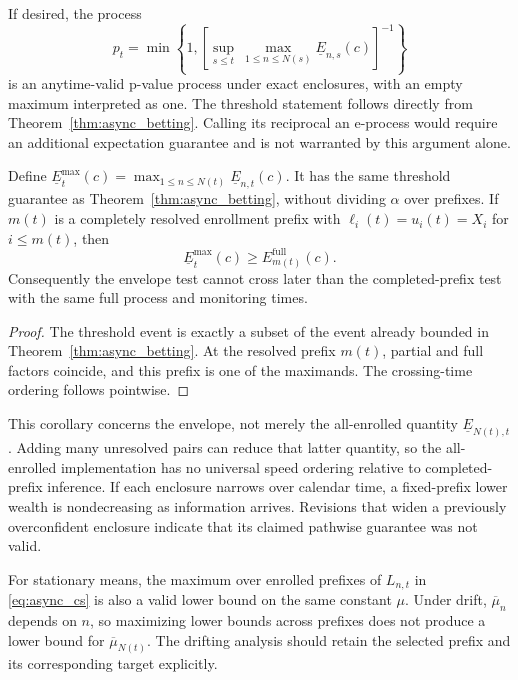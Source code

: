 If desired, the process
\[
 p_t=\min\!\left\{1,
 \left[\sup_{s\leq t}\ \max_{1\leq n\leq N(s)}
                         \underline E_{n,s}(c)\right]^{-1}\right\}
\]
is an anytime-valid p-value process under exact enclosures, with an empty
maximum interpreted as one. The threshold statement follows directly
from Theorem~\ref{thm:async_betting}. Calling its reciprocal an e-process
would require an additional expectation guarantee and is not warranted
by this argument alone.

\begin{corollary}
\label{cor:async_envelope}
\leavevmode\par
Define $\underline E_t^{\max}(c)
=\max_{1\leq n\leq N(t)}\underline E_{n,t}(c)$. It has the same
threshold guarantee as Theorem~\ref{thm:async_betting}, without dividing
$\alpha$ over prefixes. If $m(t)$ is a completely resolved enrollment
prefix with $\ell_i(t)=u_i(t)=X_i$ for $i\leq m(t)$, then
\[
 \underline E_t^{\max}(c)\geq E_{m(t)}^{\mathrm{full}}(c).
\]
Consequently the envelope test cannot cross later than the
completed-prefix test with the same full process and monitoring times.
\end{corollary}
\begin{proof}
The threshold event is exactly a subset of the event already bounded in
Theorem~\ref{thm:async_betting}. At the resolved prefix $m(t)$, partial
and full factors coincide, and this prefix is one of the maximands.
The crossing-time ordering follows pointwise.
\end{proof}

This corollary concerns the envelope, not merely the all-enrolled
quantity $\underline E_{N(t),t}$. Adding many unresolved pairs can reduce
that latter quantity, so the all-enrolled implementation has no universal
speed ordering relative to completed-prefix inference. If each enclosure
narrows over calendar time, a fixed-prefix lower wealth is nondecreasing
as information arrives. Revisions that widen a previously overconfident
enclosure indicate that its claimed pathwise guarantee was not valid.

For stationary means, the maximum over enrolled prefixes of $L_{n,t}$
in \eqref{eq:async_cs} is also a valid lower bound on the same constant
$\mu$. Under drift, $\overline\mu_n$ depends on $n$, so maximizing
lower bounds across prefixes does not produce a lower bound for
$\overline\mu_{N(t)}$. The drifting analysis should retain the selected
prefix and its corresponding target explicitly.

